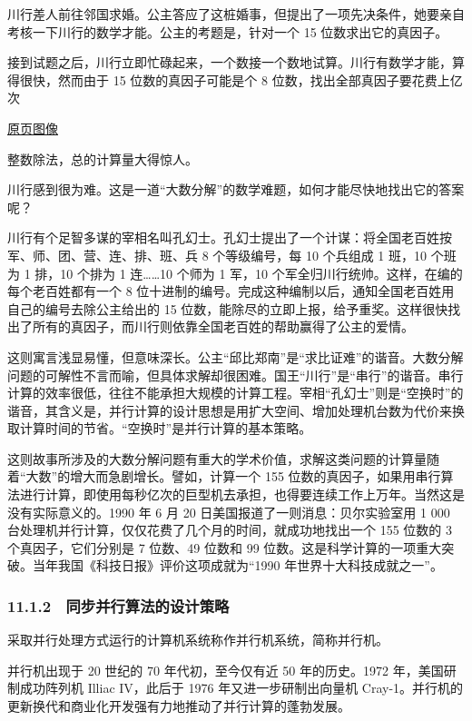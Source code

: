 \documentclass[
  10pt,
  fontset=fandol]{ctexart}
\begin{document}
川行差人前往邻国求婚。公主答应了这桩婚事，但提出了一项先决条件，她要亲自考核一下川行的数学才能。公主的考题是，针对一个 15 位数求出它的真因子。

接到试题之后，川行立即忙碌起来，一个数接一个数地试算。川行有数学才能，算得很快，然而由于 15 位数的真因子可能是个 8 位数，找出全部真因子要花费上亿次

\href{../../source-images/pdf-277.jpeg}{原页图像}

整数除法，总的计算量大得惊人。

川行感到很为难。这是一道``大数分解''的数学难题，如何才能尽快地找出它的答案呢？

川行有个足智多谋的宰相名叫孔幻士。孔幻士提出了一个计谋：将全国老百姓按军、师、团、营、连、排、班、兵 8 个等级编号，每 10 个兵组成 1 班，10 个班为 1 排，10 个排为 1 连\ldots\ldots10 个师为 1 军，10 个军全归川行统帅。这样，在编的每个老百姓都有一个 8 位十进制的编号。完成这种编制以后，通知全国老百姓用自己的编号去除公主给出的 15 位数，能除尽的立即上报，给予重奖。这样很快找出了所有的真因子，而川行则依靠全国老百姓的帮助赢得了公主的爱情。

这则寓言浅显易懂，但意味深长。公主``邱比郑南''是``求比证难''的谐音。大数分解问题的可解性不言而喻，但具体求解却很困难。国王``川行''是``串行''的谐音。串行计算的效率很低，往往不能承担大规模的计算工程。宰相``孔幻士''则是``空换时''的谐音，其含义是，并行计算的设计思想是用扩大空间、增加处理机台数为代价来换取计算时间的节省。``空换时''是并行计算的基本策略。

这则故事所涉及的大数分解问题有重大的学术价值，求解这类问题的计算量随着``大数''的增大而急剧增长。譬如，计算一个 155 位数的真因子，如果用串行算法进行计算，即使用每秒亿次的巨型机去承担，也得要连续工作上万年。当然这是没有实际意义的。1990 年 6 月 20 日美国报道了一则消息：贝尔实验室用 1 000 台处理机并行计算，仅仅花费了几个月的时间，就成功地找出一个 155 位数的 3 个真因子，它们分别是 7 位数、49 位数和 99 位数。这是科学计算的一项重大突破。当年我国《科技日报》评价这项成就为``1990 年世界十大科技成就之一''。

\subsubsection{11.1.2　同步并行算法的设计策略}\label{ux540cux6b65ux5e76ux884cux7b97ux6cd5ux7684ux8bbeux8ba1ux7b56ux7565}

采取并行处理方式运行的计算机系统称作并行机系统，简称并行机。

并行机出现于 20 世纪的 70 年代初，至今仅有近 50 年的历史。1972 年，美国研制成功阵列机 Illiac IV，此后于 1976 年又进一步研制出向量机 Cray-1。并行机的更新换代和商业化开发强有力地推动了并行计算的蓬勃发展。
\end{document}
